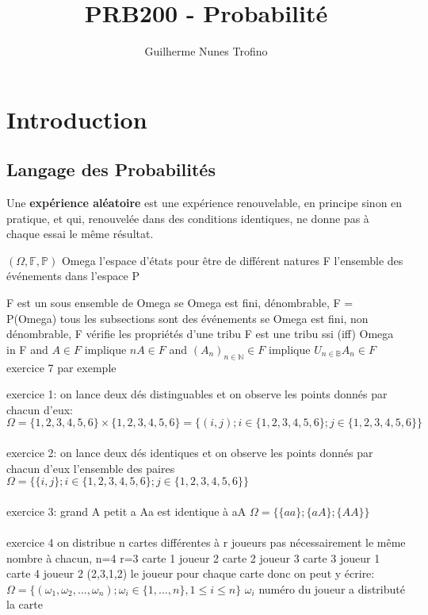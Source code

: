 \documentclass{article}
\title{PRB200 - Probabilité}
\author{Guilherme Nunes Trofino}
\begin{document}
\maketitle

\newpage\tableofcontents

\section{Introduction}
\subsection{Langage des Probabilités}
\begin{definition}
    Une \textbf{expérience aléatoire} est une expérience renouvelable, en principe sinon en pratique, et qui, renouvelée dans des conditions identiques, ne donne pas à chaque essai le même résultat.
\end{definition}
$ (\Omega, \mathbb{F}, \mathbb{P})$
Omega l'espace d'états pour être de différent natures
F l'ensemble des événements dans l'espace
P

F est un sous ensemble de Omega  
se Omega est fini, dénombrable, F = P(Omega) tous les subsections sont des événements
se Omega est fini, non dénombrable, F vérifie les propriétés d'une tribu F est une tribu ssi (iff) Omega in F and $A \in F$ implique $nA \in F$ and $(A_n)_{n\in\mathbb{N}} \in F$ implique $U_{n\in\mathbb{B}}A_n \in F$ exercice 7 par exemple


exercice 1:
on lance deux dés distinguables et on observe les points donnés par chacun d'eux:
$\Omega = \{ 1,2,3,4,5,6 \} \times \{ 1,2,3,4,5,6 \} = \{ (i,j); i \in \{1,2,3,4,5,6\}; j \in \{ 1,2,3,4,5,6 \} \}$
\\\\
exercice 2:
on lance deux dés identiques et on observe les points donnés par chacun d'eux
l'ensemble des paires
$\Omega = \{ \{i,j\}; i \in \{1,2,3,4,5,6\}; j \in \{ 1,2,3,4,5,6 \} \}$
\\\\
exercice 3:
grand A petit a
Aa est identique à aA
$\Omega = \{ \{ aa \}; \{ aA \}; \{ AA \} \}$
\\\\
exercice 4
on distribue n cartes différentes à r joueurs pas nécessairement le même nombre à chacun, 
n=4 r=3
carte 1 joueur 2
carte 2 joueur 3
carte 3 joueur 1
carte 4 joueur 2
(2,3,1,2) le joueur pour chaque carte donc on peut y écrire:
$\Omega = \{ (\omega_1, \omega_2, ..., \omega_n); \omega_i \in \{ 1, ..., n \}, 1 \leq i \leq n \}$
$\omega_i$ numéro du joueur a distributé la carte
\\\\
\end{document}
